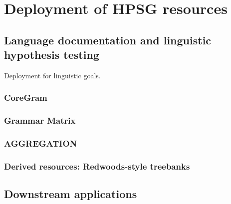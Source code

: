 \documentclass[output=paper]{langsci/langscibook}
\begin{document}



\section{Deployment of HPSG resources}
\label{cl:deployment}

\subsection{Language documentation and linguistic hypothesis testing}
\label{cl:lang-doc}

Deployment for linguistic goals.


\subsubsection{CoreGram}

\subsubsection{Grammar Matrix}

\subsubsection{AGGREGATION}

\subsubsection{Derived resources: Redwoods-style treebanks}


\subsection{Downstream applications}
\label{cl:downstream}
\end{document}
